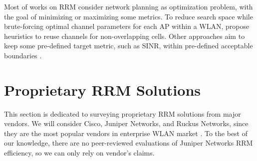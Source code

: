 Most of works on RRM consider \cite{bouhafsPerFlowRadioResource2020,levantiCAPWAPCompliantSolutionRadio2007} network planning as optimization problem, with the goal of minimizing or maximizing some metrics. To reduce search space while brute-forcing optimal channel parameters for each AP within a WLAN, \cite{levantiCAPWAPCompliantSolutionRadio2007} propose heuristics to reuse channels for non-overlapping cells. Other approaches aim to keep some pre-defined target metric, such as SINR, within pre-defined acceptable boundaries \cite{michalskiSimplePerformanceboostingAlgorithm2016}.

\section {Proprietary RRM Solutions}
\label{chap:lr:sec:prop_rrm}
This section is dedicated to surveying proprietary RRM solutions from major vendors. We will consider Cisco, Juniper Networks, and Ruckus Networks, since they are the most popular vendors in enterprise WLAN market \cite{WiFiMarketSize}. To the best of our knowledge, there are no peer-reviewed evaluations of Juniper Networks RRM efficiency, so we can only rely on vendor's claims.

